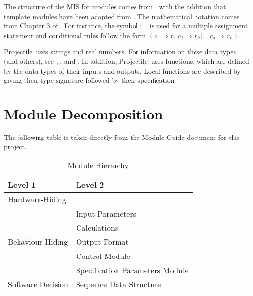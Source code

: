\documentclass[12pt, titlepage]{article}
\newcommand{\progname}{Projectile}
\begin{document}
The structure of the MIS for modules comes from \citet{HoffmanAndStrooper1995},
with the addition that template modules have been adapted from
\cite{GhezziEtAl2003}.  The mathematical notation comes from Chapter 3 of
\citet{HoffmanAndStrooper1995}.  For instance, the symbol := is used for a
multiple assignment statement and conditional rules follow the form $(c_1
\Rightarrow r_1 | c_2 \Rightarrow r_2 | ... | c_n \Rightarrow r_n )$.

\progname\ uses strings and real numbers. For information on these data types 
(and others), see \cite{GhezziEtAl2003}, \cite{GriesAndSchneider1993}, and 
\cite{HoffmanAndStrooper1995}. In addition, \progname\ uses functions, which are
defined by the data types of their inputs and outputs. Local functions are
described by giving their type signature followed by their specification.

\newpage
\section{Module Decomposition}

The following table is taken directly from the Module Guide document for this project.

\begin{table}[h!]
\centering
\begin{tabular}{p{} p{}}
\toprule
\textbf{Level 1} & \textbf{Level 2}\\
\midrule

{Hardware-Hiding} & ~ \\
\midrule

\multirow{5}{0.3\textwidth}{Behaviour-Hiding} & Input Parameters\\
& Calculations\\
& Output Format\\
& Control Module\\
& Specification Parameters Module\\
\midrule

\multirow{1}{0.3\textwidth}{Software Decision} & Sequence Data Structure\\
\bottomrule

\end{tabular}
\caption{Module Hierarchy}
\label{TblMH}
\end{table}

\newpage
\end{document}
